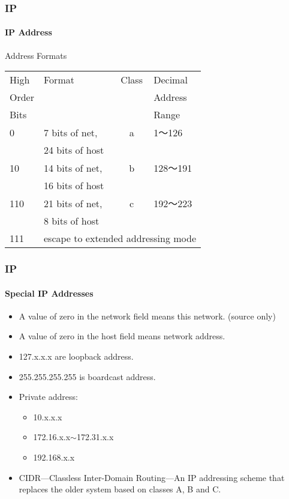 \documentclass[hyperref={xetex,colorlinks,linkcolor=blue},green,compress]{beamer}
\begin{document}
  \begin{frame}
    \frametitle{IP} \framesubtitle{IP Address}
    \begin{exampleblock}{Address Formats}
      \begin{center}
        \begin{tabular}{|llcl|}
          \hline
          High & Format & Class & Decimal\\
          Order&&&Address\\
          Bits&&&Range\\\hline
          0 & 7 bits of net, & a & 1～126\\%
          & 24 bits of host&&\\\hline
          10 & 14 bits of net, & b & 128～191\\
          & 16 bits of host&&\\\hline
          110 & 21 bits of net, & c & 192～223\\
          & 8 bits of host&&\\\hline
          111 & \multicolumn{3}{l|}{escape to extended addressing mode}\\\hline
        \end{tabular}
      \end{center}
    \end{exampleblock}
  \end{frame}

  \begin{frame}
    \frametitle{IP} \framesubtitle{Special IP Addresses}
    \begin{itemize}
    \item A value of zero in the network field means this
      network. (source only)
    \item A value of zero in the host field means network address.
    \item 127.x.x.x are loopback address.
    \item 255.255.255.255 is boardcast address.
    \item Private address:
      \begin{itemize}
      \item 10.x.x.x
      \item 172.16.x.x$\sim$172.31.x.x
      \item 192.168.x.x
      \end{itemize}
    \item CIDR---Classless Inter-Domain Routing---An IP addressing
      scheme that replaces the older system based on classes A, B and
      C. %
    \end{itemize}
  \end{frame}
\end{document}

